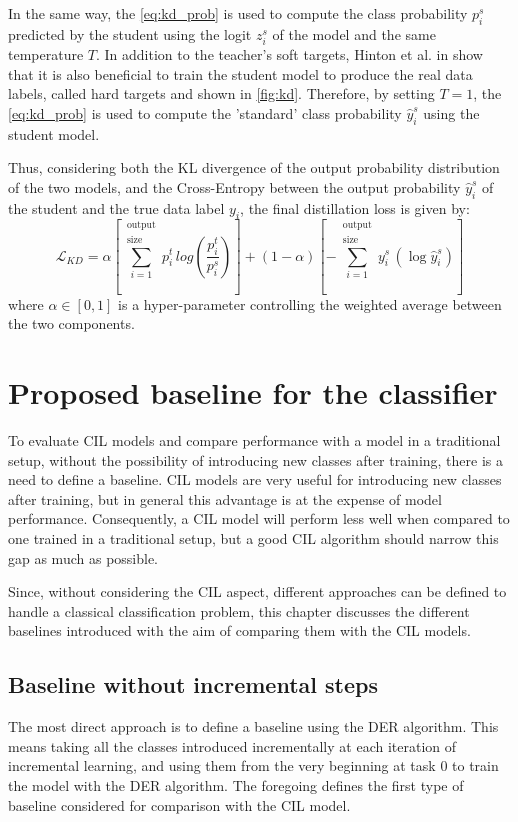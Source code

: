 In the same way, the \autoref{eq:kd_prob} is used to compute the class probability $p_i^s$ predicted by the student using the logit $z_i^s$ of the model and the same temperature $T$. In addition to the teacher's soft targets, Hinton et al. in \cite{hinton2015distilling} show that it is also beneficial to train the student model to produce the real data labels, called hard targets and shown in \autoref{fig:kd}.
Therefore, by setting $T = 1$, the \autoref{eq:kd_prob} is used to compute the 'standard' class probability $\hat{y}_i^s$ using the student model.

Thus, considering both the KL divergence of the output probability distribution of the two models, and the Cross-Entropy between the output probability $\hat{y}_i^s$ of the student and the true data label $y_i$, the final distillation loss is given by:
\begin{equation}
    \mathcal{L}_{KD} = \alpha \left[\sum_{i=1}^{\substack{\text{output}\\\text{size}}} p_i^t \, log \left( \frac{p_i^t}{p_i^s} \right) \right]
    + (1-\alpha) \left[-\sum_{i=1}^{\substack{\text{output}\\\text{size}}} y_i^s \, (\log \hat{y}_i^s) \right]
\end{equation}
where $\alpha \in [0, 1]$ is a hyper-parameter controlling the weighted average between the two components.

\section{Proposed baseline for the classifier}
\label{sec:method-baseline}
To evaluate CIL models and compare performance with a model in a traditional setup, without the possibility of introducing new classes after training, there is a need to define a baseline. CIL models are very useful for introducing new classes after training, but in general this advantage is at the expense of model performance. Consequently, a CIL model will perform less well when compared to one trained in a traditional setup, but a good CIL algorithm should narrow this gap as much as possible. 

Since, without considering the CIL aspect, different approaches can be defined to handle a classical classification problem, this chapter discusses the different baselines introduced with the aim of comparing them with the CIL models.

\subsection{Baseline without incremental steps}
The most direct approach is to define a baseline using the DER algorithm. This means taking all the classes introduced incrementally at each iteration of incremental learning, and using them from the very beginning at task 0 to train the model with the DER algorithm. The foregoing defines the first type of baseline considered for comparison with the CIL model.

